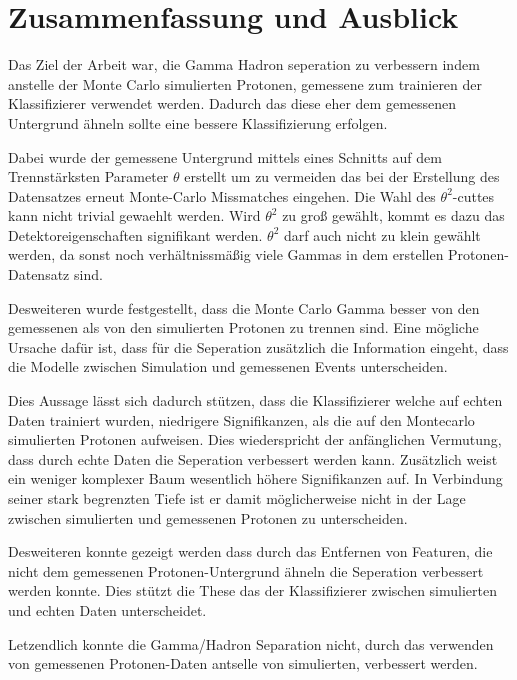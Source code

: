 \chapter{Zusammenfassung und Ausblick}
Das Ziel der Arbeit war, die Gamma Hadron seperation zu verbessern indem anstelle der Monte Carlo simulierten Protonen, gemessene zum trainieren der Klassifizierer verwendet werden. 
Dadurch das diese eher dem gemessenen Untergrund ähneln sollte eine bessere Klassifizierung erfolgen.

Dabei wurde der gemessene Untergrund mittels eines Schnitts auf dem Trennstärksten Parameter $\theta$ erstellt um zu vermeiden das bei der Erstellung des Datensatzes erneut Monte-Carlo Missmatches eingehen.
Die Wahl des $\theta^{2}$-cuttes kann nicht trivial gewaehlt werden. 
Wird $\theta^{2}$ zu groß gewählt, kommt es dazu das Detektoreigenschaften signifikant werden. 
$\theta^{2}$ darf auch nicht zu klein gewählt werden, da sonst noch verhältnissmäßig viele Gammas in dem erstellen Protonen-Datensatz sind.

Desweiteren wurde festgestellt, dass die Monte Carlo Gamma besser von den gemessenen als von den simulierten Protonen zu trennen sind. 
Eine mögliche Ursache dafür ist, dass für die Seperation zusätzlich die Information eingeht, dass die Modelle zwischen Simulation und gemessenen Events unterscheiden.

Dies Aussage lässt sich dadurch stützen, dass die Klassifizierer welche auf echten Daten trainiert wurden, niedrigere Signifikanzen, als die auf den Montecarlo simulierten Protonen aufweisen. 
Dies wiederspricht der anfänglichen Vermutung, dass durch echte Daten die Seperation verbessert werden kann. 
Zusätzlich weist ein weniger komplexer Baum wesentlich höhere Signifikanzen auf. 
In Verbindung seiner stark begrenzten Tiefe ist er damit möglicherweise nicht in der Lage zwischen simulierten und gemessenen Protonen zu unterscheiden. 

Desweiteren konnte gezeigt werden dass durch das Entfernen von Featuren, die nicht dem gemessenen Protonen-Untergrund ähneln die Seperation verbessert werden konnte. 
Dies stützt die These das der Klassifizierer zwischen simulierten und echten Daten unterscheidet.

Letzendlich konnte die Gamma/Hadron Separation nicht, durch das verwenden von gemessenen Protonen-Daten antselle von simulierten, verbessert werden. 
